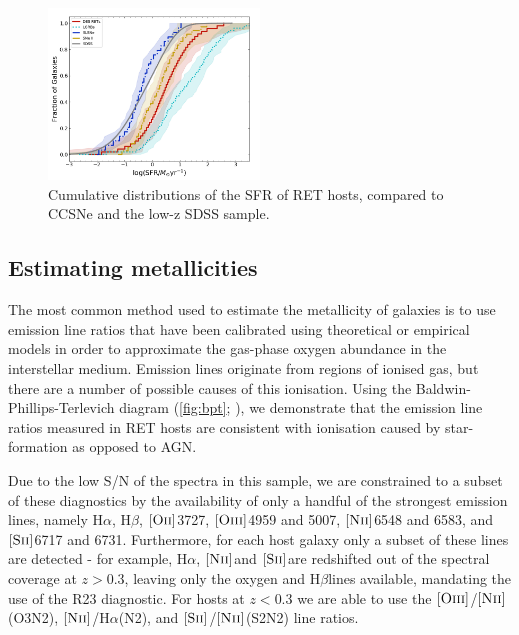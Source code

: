 \documentclass[fleqn,usenatbib,]{mnras}
\newcommand{\halpha}[0]{H$\alpha$}
\newcommand{\hbeta}[0]{H$\beta$}
\newcommand{\OII}[0]{$[\textnormal{\textsc{Oii}}]$}
\newcommand{\OIII}[0]{$[\textnormal{\textsc{Oiii}}]$}
\newcommand{\SII}[0]{$[\textnormal{\textsc{Sii}}]$}
\newcommand{\NII}[0]{$[\textnormal{\textsc{Nii}}]$}
\begin{document}
\begin{figure}
\includegraphics[width=0.5\textwidth]{figs/cum_SFR_mike.png}
\caption{Cumulative distributions of the SFR of RET hosts, compared to CCSNe and the low-z SDSS sample.
\label{fig:sfr_cum}}
\end{figure}
\subsection{Estimating metallicities \label{subsec:calc_Z}}

The most common method used to estimate the metallicity of galaxies is to use emission line ratios that have been calibrated using theoretical or empirical models in order to approximate the gas-phase oxygen abundance in the interstellar medium. Emission lines originate from regions of ionised gas, but there are a number of possible causes of this ionisation. Using the Baldwin-Phillips-Terlevich diagram (\ref{fig:bpt}; \citealt{Baldwin1981}), we demonstrate that the emission line ratios measured in RET hosts are consistent with ionisation caused by star-formation as opposed to AGN. 

Due to the low S/N of the spectra in this sample, we are constrained to a subset of these diagnostics by the availability of only a handful of the strongest emission lines, namely \halpha, \hbeta, \OII 3727, \OIII 4959 and 5007, \NII 6548 and 6583, and \SII 6717 and 6731. Furthermore, for each host galaxy only a subset of these lines are detected - for example, \halpha, \NII and \SII are redshifted out of the spectral coverage at $z>0.3$, leaving only the oxygen and \hbeta lines available, mandating the use of the R23 diagnostic. For hosts at $z<0.3$ we are able to use the \OIII /\NII (O3N2), \NII /\halpha (N2), and \SII /\NII (S2N2) line ratios. 
\end{document}
